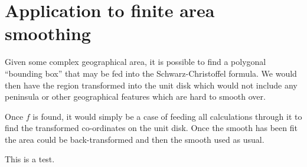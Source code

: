 \documentclass[a4paper,10pt]{amsart}
\newcommand{\sch}{Schwarz-Christoffel }
\begin{document}
\section{Application to finite area smoothing}

Given some complex geographical area, it is possible to find a polygonal ``bounding box'' that may be fed into the \sch formula. We would then have the region transformed into the  unit disk which would not include any peninsula or other geographical features which are hard to smooth over.

Once $f$ is found, it would simply be a case of feeding all calculations through it to find the transformed co-ordinates on the unit disk. Once the smooth has been fit the area could be back-transformed and then the smooth used as usual.

This is a test.







\end{document}

